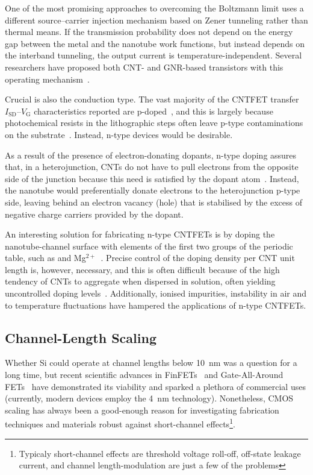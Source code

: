 One of the most promising approaches to overcoming the Boltzmann limit uses a different source--carrier injection mechanism based on Zener tunneling rather than thermal means. If the transmission probability does not depend on the energy gap between the metal and the nanotube work functions, but instead depends on the interband tunneling, the output current is temperature-independent. Several researchers have proposed both \gls{CNT}- and \gls{GNR}-based transistors with this operating mechanism~\cite{ionescu2011tunnel, hammam2018sub, hwang2019room}.

Crucial is also the conduction type. The vast majority of the \gls{CNTFET} transfer $I_\textrm{SD}$--$V_\textrm{G}$ characteristics reported are p-doped~\cite{allen2007carbon}, and this is largely because photochemical resists in the lithographic steps often leave p-type contaminations on the substrate~\cite{nosho2005n}. Instead, n-type devices would be desirable.

As a result of the presence of electron-donating dopants, n-type doping assures that, in a heterojunction, \glspl{CNT} do not have to pull electrons from the opposite side of the junction because this need is satisfied by the dopant atom~\cite{brownlie2018advances}. Instead, the nanotube would preferentially donate electrons to the heterojunction p-type side, leaving behind an electron vacancy (hole) that is stabilised by the excess of negative charge carriers provided by the dopant.

An interesting solution for fabricating n-type \glspl{CNTFET} is by doping the nanotube-channel surface with elements of the first two groups of the periodic table, such as  and Mg$^{2+}$~\cite{bockrath2000chemical, zhou2000modulated}. Precise control of the doping density per \gls{CNT} unit length is, however, necessary, and this is often difficult because of the high tendency of \glspl{CNT} to aggregate when dispersed in solution, often yielding uncontrolled doping levels~\cite{brownlie2018advances, yu2012air}. Additionally, ionised impurities, instability in air and to temperature fluctuations have hampered the applications of n-type \glspl{CNTFET}.

\subsection{Channel-Length Scaling}

Whether Si could operate at channel lengths below \SI{10}{\nano\metre} was a question for a long time, but recent scientific advances in FinFETs~\cite{yang20045nm} and Gate-All-Around FETs~\cite{gu2011first} have demonstrated its viability and sparked a plethora of commercial uses (currently, modern devices employ the \SI{4}{\nano\metre} technology). Nonetheless, \gls{CMOS} scaling has always been a good-enough reason for investigating fabrication techniques and materials robust against short-channel effects\footnote[2]{Typicaly short-channel effects are threshold voltage roll-off, off-state leakage current, and channel length-modulation are just a few of the problems}.

